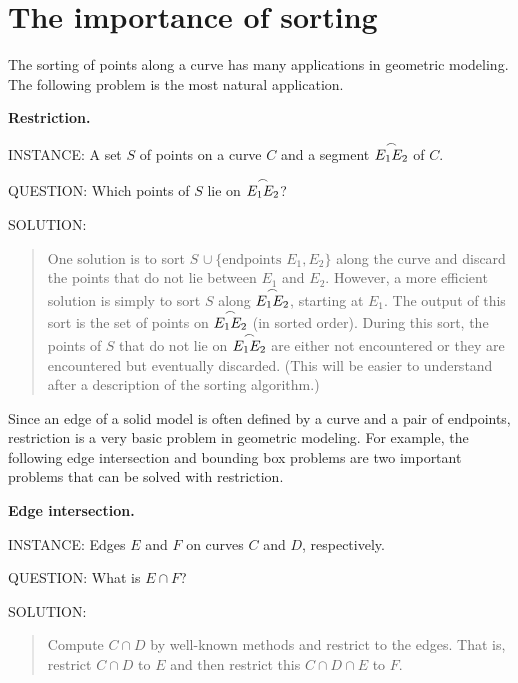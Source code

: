 \section{The importance of sorting}
The sorting of points along a curve has many applications 
in geometric modeling. 
The following problem is the most natural application.

\vspace{.2in}

{\bf Restriction.}

INSTANCE: A set $S$ of points on a curve $C$ and a segment 
$\mbox{$\stackrel{\frown}{E_{1}E_{2}}$}$ of $C$.

QUESTION: Which points of $S$ lie on $\mbox{$\stackrel{\frown}{E_{1}E_{2}}$}$? 

SOLUTION: 
\begin{quote}
	One solution is to sort $S$ 
	$\cup\ \{\mbox{endpoints } E_{1},E_{2}\}$ along the curve
	and discard the points that do not lie between $E_{1}$ and $E_{2}$.
	However, a more efficient solution is simply to sort $S$ along 
	$\mbox{$\stackrel{\frown}{E_{1}E_{2}}$}$, 
	starting at $E_{1}$.  
	The output of this sort is the set of points on $\mbox{$\stackrel{\frown}{E_{1}E_{2}}$}$
	(in sorted order).
	During this sort, the points of $S$ that do not lie on 
	$\mbox{$\stackrel{\frown}{E_{1}E_{2}}$}$ are either 
	not encountered or they are encountered but eventually discarded. 
	(This will be easier to understand after a description of the 
	sorting algorithm.)
\end{quote}
\vspace{.25in}

Since an edge of a solid model is often defined by a curve and a pair of 
endpoints,
restriction is a very basic problem in geometric modeling.
For example, the following edge intersection and bounding box problems are 
two important 
problems that can be solved with restriction.

\vspace{.2in}

{\bf Edge intersection.}

INSTANCE: Edges $E$ and $F$ on curves $C$ and $D$, respectively.

QUESTION: What is $E \cap F$?

{\samepage
SOLUTION: 
\begin{quote}
Compute $C \cap D$ by well-known methods and restrict to the edges.
That is, restrict $C \cap D$ to $E$ and then restrict this 
$C \cap D \cap E$ to $F$.
\end{quote}

}
\vspace{.2in}

